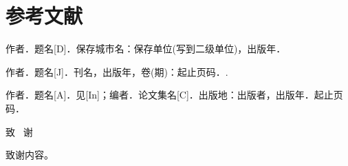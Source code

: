 \documentclass{nwputhesis}
\begin{document}
\makespace
\section*{参考文献}
\begingroup  %
\renewcommand{\section}[2]{}
\begin{thebibliography}{99}     %
    \addtolength{\itemsep}{-0.6em} %
    \begin{spacing}{1.0}           %

        作者．题名[D]．保存城市名：保存单位(写到二级单位)，出版年．

        作者．题名[J]．刊名，出版年，卷(期)：起止页码．.

        作者．题名[A]．见[In]；编者．论文集名[C]．出版地：出版者，出版年．起止页码．

    \end{spacing}
\end{thebibliography}


\makespace %
\section*{致谢}
\begin{center}
    { \blackti \fontsize{16.0600pt}{1.25}致 \, 谢}
\end{center}
致谢内容。
\end{document}
